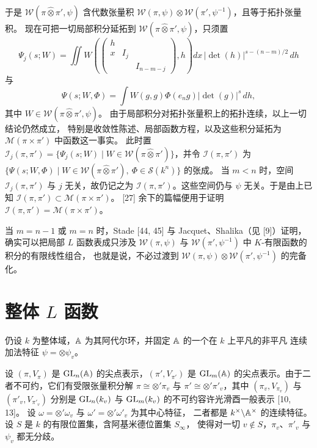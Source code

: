 于是 $\mathcal{W}(\pi\widehat{\otimes}\pi',\psi)$ 含代数张量积
$\mathcal{W}(\pi,\psi)\otimes\mathcal{W}(\pi',\psi^{-1})$，且等于拓扑张量积。
现在可把一切局部积分延拓到 $\mathcal{W}(\pi\widehat{\otimes}\pi',\psi)$，只须置
\[
\Psi_j(s;W)=\iint W\left(\begin{pmatrix}h\\x&I_j\\&&I_{n-m-j}\end{pmatrix},h\right)
dx\,|\det(h)|^{s-(n-m)/2}\,dh
\]
与
\[
\Psi(s;W,\Phi)=\int W(g,g)\Phi(e_ng)|\det(g)|^s\,dh,
\]
其中 $W\in\mathcal{W}(\pi\widehat{\otimes}\pi',\psi)$。
由于局部积分对拓扑张量积上的拓扑连续，以上一切结论仍然成立，
特别是收敛性陈述、局部函数方程，以及这些积分延拓为
$\mathcal{M}(\pi\times\pi')$ 中函数这一事实。
此时置 $\mathcal{I}_j(\pi,\pi')=\{\Psi_j(s;W)\mid
W\in\mathcal{W}(\pi\widehat{\otimes}\pi')\}$，并令 $\mathcal{I}(\pi,\pi')$ 为
$\{\Psi(s;W,\Phi)\mid W\in\mathcal{W}(\pi\widehat{\otimes}\pi'),\
\Phi\in\mathcal{S}(k^n)\}$ 的张成。
当 $m<n$ 时，空间 $\mathcal{I}_j(\pi,\pi')$ 与 $j$ 无关，故仍记之为
$\mathcal{I}(\pi,\pi')$。这些空间仍与 $\psi$ 无关。于是由上已知
$\mathcal{I}(\pi,\pi')\subset\mathcal{M}(\pi\times\pi')$。
[27] 余下的篇幅便用于证明 $\mathcal{I}(\pi,\pi')=\mathcal{M}(\pi\times\pi')$。

当 $m=n-1$ 或 $m=n$ 时，Stade [44, 45] 与 Jacquet、Shalika（见 [9]）证明，
确实可以把局部 $L$ 函数表成只涉及 $\mathcal{W}(\pi,\psi)$ 与
$\mathcal{W}(\pi',\psi^{-1})$ 中 $K$-有限函数的积分的有限线性组合，
也就是说，不必过渡到 $\mathcal{W}(\pi,\psi)\otimes\mathcal{W}(\pi',\psi^{-1})$
的完备化。

\section{整体 \texorpdfstring{$L$}{L} 函数}

仍设 $k$ 为整体域，$\mathbb{A}$ 为其阿代尔环，并固定 $\mathbb{A}$ 的一个在 $k$ 上平凡的非平凡
连续加法特征 $\psi=\otimes\psi_v$。

设 $(\pi,V_\pi)$ 是 $\mathrm{GL}_n(\mathbb{A})$ 的尖点表示，$(\pi',V_{\pi'})$ 是 $\mathrm{GL}_m(\mathbb{A})$
的尖点表示。由于二者不可约，它们有受限张量积分解 $\pi\cong\otimes'\pi_v$ 与
$\pi'\cong\otimes'\pi'_v$，其中 $(\pi_v,V_{\pi_v})$ 与 $(\pi'_v,V_{\pi'_v})$
分别是 $\mathrm{GL}_n(k_v)$ 与 $\mathrm{GL}_m(k_v)$ 的不可约容许光滑酉一般表示 [10, 13]。
设 $\omega=\otimes'\omega_v$ 与 $\omega'=\otimes'\omega'_v$ 为其中心特征，
二者都是 $k^\times\backslash\mathbb{A}^\times$ 的连续特征。
设 $S$ 是 $k$ 的有限位置集，含阿基米德位置集 $S_\infty$，
使得对一切 $v\notin S$，$\pi_v$、$\pi'_v$ 与 $\psi_v$ 都无分歧。

